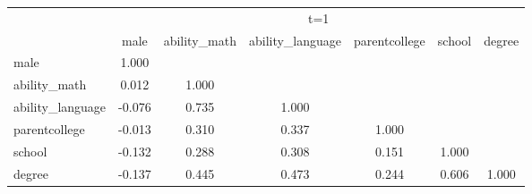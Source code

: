 \begin{tabular}{l*{6}{c}}
\hline\hline
            &\multicolumn{6}{c}{t=1}                                                      \\
            &        male&ability\_math&ability\_language&parentcollege&      school&      degree\\
\hline
male        &       1.000&            &            &            &            &            \\
ability\_math&       0.012&       1.000&            &            &            &            \\
ability\_language&      -0.076&       0.735&       1.000&            &            &            \\
parentcollege&      -0.013&       0.310&       0.337&       1.000&            &            \\
school      &      -0.132&       0.288&       0.308&       0.151&       1.000&            \\
degree      &      -0.137&       0.445&       0.473&       0.244&       0.606&       1.000\\
\hline\hline
\end{tabular}
